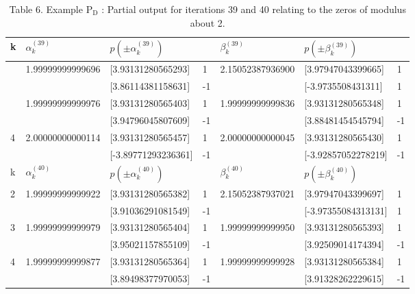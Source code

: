 \documentclass[10pt]{article}
\begin{document}
\begin{table}[h]
\begin{center}
\captionsetup{labelformat=empty}
\caption{Table 6. Example $\mathrm{P}_{\mathrm{D}}$ : Partial output for iterations 39 and 40 relating to the zeros of modulus about 2.}
\begin{tabular}{|l|l|l|l|l|l|l|}
\hline
k & $\alpha_{k}^{(39)}$ & $p\left( \pm \alpha_{k}^{(39)}\right)$ &  & $\beta_{k}^{(39)}$ & $p\left( \pm \beta_{k}^{(39)}\right)$ &  \\
\hline
\multirow{2}{*}{} & \multirow[t]{2}{*}{1.99999999999696} & [3.93131280565293] & 1 & 2.15052387936900 & [3.97947043399665] & 1 \\
\hline
 &  & [3.86114381158631] & -1 &  & [-3.9735508431311] & 1 \\
\hline
\multirow{2}{*}{} & \multirow[t]{2}{*}{1.99999999999976} & [3.93131280565403] & 1 & 1.99999999999836 & [3.93131280565348] & 1 \\
\hline
 &  & [3.94796045807609] & -1 &  & [3.88481454545794] & -1 \\
\hline
\multirow[t]{2}{*}{4} & \multirow[t]{2}{*}{2.00000000000114} & [3.93131280565457] & 1 & 2.00000000000045 & [3.93131280565430] & 1 \\
\hline
 &  & [-3.89771293236361] & -1 &  & [-3.92857052278219] & -1 \\
\hline
k & $\alpha_{k}^{(40)}$ & $p\left( \pm \alpha_{k}^{(40)}\right)$ &  & $\beta_{k}^{(40)}$ & $p\left( \pm \beta_{k}^{(40)}\right)$ &  \\
\hline
\multirow[t]{2}{*}{2} & \multirow[t]{2}{*}{1.99999999999922} & [3.93131280565382] & 1 & 2.15052387937021 & [3.97947043399697] & 1 \\
\hline
 &  & [3.91036291081549] & -1 &  & [-3.97355084313131] & 1 \\
\hline
\multirow[t]{2}{*}{3} & \multirow[t]{2}{*}{1.99999999999979} & [3.93131280565404] & 1 & 1.99999999999950 & [3.93131280565393] & 1 \\
\hline
 &  & [3.95021157855109] & -1 &  & [3.92509014174394] & -1 \\
\hline
\multirow[t]{2}{*}{4} & \multirow[t]{2}{*}{1.99999999999877} & [3.93131280565364] & 1 & 1.99999999999928 & [3.93131280565384] & 1 \\
\hline
 &  & [3.89498377970053] & -1 &  & [3.91328262229615] & -1 \\
\hline
\end{tabular}
\end{center}
\end{table}
\end{document}
